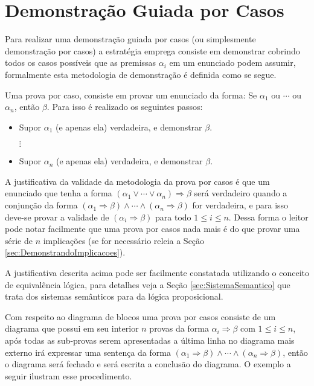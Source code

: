 \section{Demonstração Guiada por Casos}

Para realizar uma demonstração guiada por casos (ou simplesmente demonstração por casos) a estratégia emprega consiste em demonstrar cobrindo todos os casos possíveis que as premissas  $\alpha_i$ em um enunciado podem assumir, formalmente esta metodologia de demonstração é definida como se segue.

\begin{definition}\label{metodo:PorCasos}
	Uma prova por caso, consiste em provar um enunciado da forma: Se $\alpha_1$ ou $\cdots$ ou $\alpha_n$, então $\beta$. Para isso é realizado os seguintes passos:
	\begin{itemize}
		\item Supor $\alpha_1$ (e apenas ela) verdadeira, e demonstrar $\beta$.
		
		$\vdots$
		
		\item Supor $\alpha_n$ (e apenas ela) verdadeira, e demonstrar $\beta$.
	\end{itemize}
\end{definition}

A justificativa da validade  da metodologia da prova por casos é que um enunciado que tenha a forma $(\alpha_1 \lor \cdots \lor \alpha_n) \Rightarrow \beta$ será verdadeiro quando a conjunção da forma $(\alpha_1 \Rightarrow \beta) \land \cdots \land (\alpha_n \Rightarrow \beta)$ for verdadeira,  e para isso deve-se provar a validade de $(\alpha_i \Rightarrow \beta)$ para todo $1 \leq i \leq n$. Dessa forma o leitor pode notar facilmente que uma prova por casos nada mais é do que provar uma série de $n$ implicações (se for necessário releia a Seção \ref{sec:DemonstrandoImplicacoes}).

\begin{remark}
	A justificativa descrita acima pode ser facilmente constatada utilizando o conceito de equivalência lógica, para detalhes veja a Seção \ref{sec:SistemaSemantico} que trata dos sistemas semânticos para da lógica proposicional.
\end{remark}
	
Com respeito ao diagrama de blocos uma prova por casos consiste de um diagrama que possui em seu interior $n$ provas da forma $\alpha_i \Rightarrow \beta$ com $1 \leq i \leq n$, após todas as sub-provas serem apresentadas a última linha no diagrama mais externo irá expressar uma sentença da forma $(\alpha_1 \Rightarrow \beta) \land \cdots \land (\alpha_n \Rightarrow \beta)$, então o diagrama será fechado e será escrita a conclusão do diagrama. O exemplo a seguir ilustram esse procedimento.


